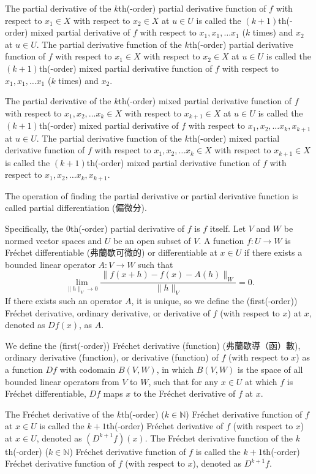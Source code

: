 \documentclass[a4paper,12pt]{report}
\begin{document}
\begin{itemize}
\begin{itemize}
The partial derivative of the $k$th(-order) partial derivative function of $f$ with respect to $ x_1\in X$ with respect to $ x_2\in X$ at $u\in U$ is called the $(k+1)$th(-order) mixed partial derivative of $f$ with respect to $ x_1, x_1,\dots  x_1$ ($k$ times) and $ x_2$ at $u\in U$. The partial derivative function of the $k$th(-order) partial derivative function of $f$ with respect to $ x_1\in X$ with respect to $ x_2\in X$ at $u\in U$ is called the $(k+1)$th(-order) mixed partial derivative function of $f$ with respect to $ x_1, x_1,\dots  x_1$ ($k$ times) and $ x_2$.

The partial derivative of the $k$th(-order) mixed partial derivative function of $f$ with respect to $ x_1, x_2,\dots  x_k\in X$ with respect to $ x_{k+1}\in X$ at $u\in U$ is called the $(k+1)$th(-order) mixed partial derivative of $f$ with respect to $ x_1, x_2,\dots  x_k, x_{k+1}$ at $u\in U$. The partial derivative function of the $k$th(-order) mixed partial derivative function of $f$ with respect to $ x_1, x_2,\dots  x_k\in X$ with respect to $ x_{k+1}\in X$ is called the $(k+1)$th(-order) mixed partial derivative function of $f$ with respect to $ x_1, x_2,\dots  x_k, x_{k+1}$.

The operation of finding the partial derivative or partial derivative function is called partial differentiation (偏微分).

Specifically, the $0$th(-order) partial derivative of $f$ is $f$ itself.
Let $V$ and $W$ be normed vector spaces and $U$ be an open subset of $V$. A function $f\colon U\to W$ is Fréchet differentiable (弗蘭歇可微的) or differentiable at $x\in U$ if there exists a bounded linear operator $A\colon V\to W$ such that
\[\lim_{\|h\|_V\to 0}\frac{\|f(x+h)-f(x)-A(h)\|_W}{\|h\|_V}=0.\]
If there exists such an operator $A$, it is unique, so we define the (first(-order)) Fréchet derivative, ordinary derivative, or derivative of $f$ (with respect to $x$) at $x$, denoted as $Df(x)$, as $A$.

We define the (first(-order)) Fréchet derivative (function) (弗蘭歇導（函）數), ordinary derivative (function), or derivative (function) of $f$ (with respect to $x$) as a function $Df$ with codomain $B(V,W)$, in which $B(V,W)$ is the space of all bounded linear operators from $V$ to $W$, such that for any $x\in U$ at which $f$ is Fréchet differentiable, $Df$ maps $x$ to the Fréchet derivative of $f$ at $x$.

The Fréchet derivative of the $k$th(-order) ($k\in\mathbb{N}$) Fréchet derivative function of $f$ at $x\in U$ is called the $k+1$th(-order) Fréchet derivative of $f$ (with respect to $x$) at $x\in U$, denoted as $(D^{k+1}f)(x)$. The Fréchet derivative function of the $k$th(-order) ($k\in\mathbb{N}$) Fréchet derivative function of $f$ is called the $k+1$th(-order) Fréchet derivative function of $f$ (with respect to $x$), denoted as $D^{k+1}f$.


\end{itemize}
\end{itemize}
\end{document}
